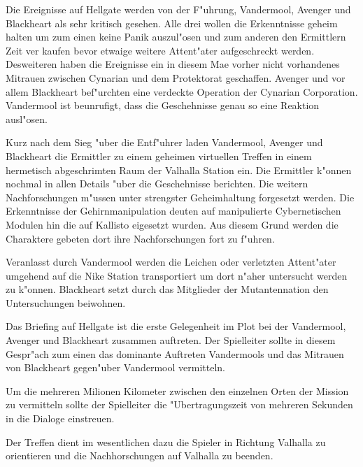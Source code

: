 
Die Ereignisse auf Hellgate werden von der F"uhrung, Vandermool, Avenger und Blackheart als sehr kritisch gesehen. Alle drei wollen die Erkenntnisse geheim halten um zum einen keine Panik auszul"osen und zum anderen den Ermittlern Zeit ver kaufen bevor etwaige weitere Attent"ater aufgeschreckt werden. Desweiteren haben die Ereignisse ein in diesem Ma\3e vorher nicht vorhandenes Mi\3trauen zwischen Cynarian und dem Protektorat geschaffen. Avenger und vor allem Blackheart bef"urchten eine verdeckte Operation der Cynarian Corporation. Vandermool ist beunrufigt, dass die Geschehnisse genau so eine Reaktion ausl"osen.

Kurz nach dem Sieg "uber die Entf"uhrer laden Vandermool, Avenger und Blackheart die Ermittler zu einem geheimen virtuellen Treffen in einem hermetisch abgeschrimten Raum der Valhalla Station ein. Die Ermittler k"onnen nochmal in allen Details "uber die Geschehnisse berichten. Die weitern Nachforschungen m"ussen unter strengster Geheimhaltung forgesetzt werden. Die Erkenntnisse der Gehirnmanipulation deuten auf manipulierte Cybernetischen Modulen hin die auf Kallisto eigesetzt wurden. Aus diesem Grund werden die Charaktere gebeten dort ihre Nachforschungen fort zu f"uhren.

Veranlasst durch Vandermool werden die Leichen oder verletzten Attent"ater umgehend auf die Nike Station transportiert um dort n"aher untersucht werden zu k"onnen. Blackheart setzt durch das Mitglieder der Mutantennation den Untersuchungen beiwohnen.

\begin{remarks}
	Das Briefing auf Hellgate ist die erste Gelegenheit im Plot bei der Vandermool, Avenger und Blackheart zusammen auftreten. Der Spielleiter sollte in diesem Gespr"ach zum einen das dominante Auftreten Vandermools und das Mi\3trauen von Blackheart gegen"uber Vandermool vermitteln.

	Um die mehreren Milionen Kilometer zwischen den einzelnen Orten der Mission zu vermitteln sollte der Spielleiter die "Ubertragungszeit von mehreren Sekunden in die Dialoge einstreuen.

	Der Treffen dient im wesentlichen dazu die Spieler in Richtung Valhalla zu orientieren und die Nachhorschungen auf Valhalla zu beenden.
\end{remarks}


